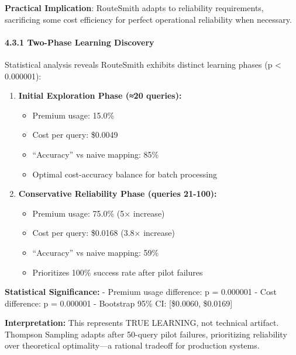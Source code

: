 \documentclass[
]{article}
\providecommand{\tightlist}{%
  \setlength{\itemsep}{0pt}\setlength{\parskip}{0pt}}
\begin{document}
\textbf{Practical Implication}: RouteSmith adapts to reliability
requirements, sacrificing some cost efficiency for perfect operational
reliability when necessary.

\hypertarget{two-phase-learning-discovery}{%
\paragraph{4.3.1 Two-Phase Learning
Discovery}\label{two-phase-learning-discovery}}

Statistical analysis reveals RouteSmith exhibits distinct learning
phases (p \textless{} 0.000001):

\begin{enumerate}
\def\labelenumi{\arabic{enumi}.}
\tightlist
\item
  \textbf{Initial Exploration Phase (≈20 queries):}

  \begin{itemize}
  \tightlist
  \item
    Premium usage: 15.0\%
  \item
    Cost per query: \$0.0049
  \item
    ``Accuracy'' vs naive mapping: 85\%
  \item
    Optimal cost-accuracy balance for batch processing
  \end{itemize}
\item
  \textbf{Conservative Reliability Phase (queries 21-100):}

  \begin{itemize}
  \tightlist
  \item
    Premium usage: 75.0\% (5× increase)
  \item
    Cost per query: \$0.0168 (3.8× increase)
  \item
    ``Accuracy'' vs naive mapping: 59\%
  \item
    Prioritizes 100\% success rate after pilot failures
  \end{itemize}
\end{enumerate}

\textbf{Statistical Significance:} - Premium usage difference: p =
0.000001 - Cost difference: p = 0.000001 - Bootstrap 95\% CI:
{[}\$0.0060, \$0.0169{]}

\textbf{Interpretation:} This represents TRUE LEARNING, not technical
artifact. Thompson Sampling adapts after 50-query pilot failures,
prioritizing reliability over theoretical optimality---a rational
tradeoff for production systems.
\end{document}
